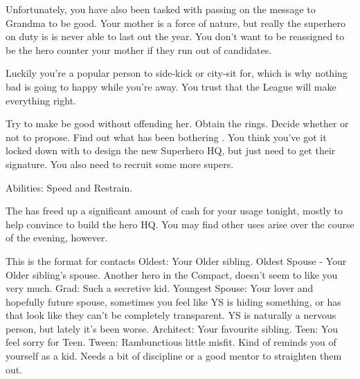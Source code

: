 \documentclass[char]{LRSguildcamp1}
\begin{document}
Unfortunately, you have also been tasked with passing on the message to Grandma to be good. Your mother is a force of nature, but really the superhero on duty is \pCityGrandma{} is never able to last out the year. You don't want to be reassigned to be the hero counter your mother if they run out of candidates. 

Luckily you're a popular person to side-kick or city-sit for, which is why nothing bad is going to happy while you're away. You trust that the League will make everything right. 


\begin{itemz}[Goals]
	\item 
	Try to make \cGrandma{} be good without offending her. 
	Obtain the rings.
	Decide whether or not to propose. 
	Find out what has been bothering \cYS{}. 
	You think you’ve got it locked down with \cArchitect{} to design the new Superhero HQ, but just need to get their signature. 
	You also need to recruit some more supers. 
	
\end{itemz}

\begin{itemz}[Notes]
	\item 
	Abilities: Speed and Restrain.
	\item The \cHeroLeague{\intro} has freed up a significant amount of cash for your usage tonight, mostly to help convince \cArchitect{} to build the hero HQ.  You may find other uses arise over the course of the evening, however.
\end{itemz}

\begin{contacts}
	\contact{}  This is the format for contacts 
	Oldest: Your Older sibling. 
	Oldest Spouse - Your Older sibling’s spouse. Another hero in the Compact, doesn’t seem to like you very much. 
	Grad: Such a secretive kid. 
	Youngest Spouse: Your lover and hopefully future spouse, sometimes you feel like YS is hiding something, or has that look like they can’t be completely transparent. YS is naturally a nervous person, but lately it’s been worse. 
	Architect: Your favourite sibling. 
	Teen: You feel sorry for Teen. 
	Tween: Rambunctious little misfit. Kind of reminds you of yourself as a kid. Needs a bit of discipline or a good mentor to straighten them out. 
	
\end{contacts}
\end{document}
